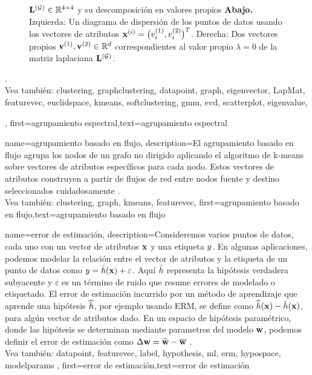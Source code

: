{{\begin{figure}[H]
\begin{center}
{					${\bf L}^{(\mathcal{G})}  \in \mathbb{R}^{4 \times 4}$ y su descomposición en valores propios 
					{\bf Abajo.} Izquierda: Un diagrama de dispersión de los puntos de datos usando los vectores de atributos
					${\bf x}^{(i)} = \big( v^{(1)}_{i},v^{(2)}_{i} \big)^{T}$. 
					Derecha: Dos vectores propios ${\bf v}^{(1)},{\bf v}^{(2)} \in \mathbb{R}^{d}$ 
					correspondientes al valor propio $\lambda=0$ de la matriz laplaciana ${\bf L}^{(\mathcal{G})}$. 
					} 
			\end{center}
		\end{figure}
	\newpage. \\
	Vea también: \gls{clustering}, \gls{graphclustering}, \gls{datapoint}, \gls{graph}, \gls{eigenvector}, \gls{LapMat}, \gls{featurevec}, \gls{euclidspace}, \gls{kmeans}, \gls{softclustering}, \gls{gmm}, \gls{evd}, \gls{scatterplot}, \gls{eigenvalue},  }, 
	first={agrupamiento espectral},text={agrupamiento espectral} 
}
{name={agrupamiento basado en flujo},
	description={El agrupamiento basado en flujo agrupa los nodos de un 
		grafo no dirigido aplicando el algoritmo de k-means sobre
		vectores de atributos específicos para cada nodo. Estos vectores de atributos construyen a partir de flujos de red entre nodos 
		fuente y destino seleccionados cuidadosamente \cite{FlowSpecClustering2021}.
		\\
	Vea también: \gls{clustering}, \gls{graph}, \gls{kmeans}, \gls{featurevec}}, 
	first={agrupamiento basado en flujo},text={agrupamiento basado en flujo} 
}



{name={error de estimación},
	description={Consideremos varios puntos de datos, cada uno con un vector de atributos ${\bf x}$ y una etiqueta
		$y$. En algunas aplicaciones, podemos modelar la relación entre el vector de atributos y la etiqueta
		de un punto de datos como $y = \bar{h}({\bf x}) + \varepsilon$. Aquí $\bar{h}$ 
		representa la hipótesis verdadera subyacente y $\varepsilon$ es un término de ruido que resume errores de modelado o etiquetado.
		El error de estimación incurrido por un método de aprendizaje que aprende una hipótesis $\widehat{h}$, por ejemplo usando ERM, se define como 
		$\widehat{h}({\bf x}) - \bar{h}({\bf x})$, para algún vector de atributos dado. 
		En un espacio de hipótesis paramétrico, donde las hipótesis se determinan mediante
		parametros del modelo ${\bf w}$, podemos definir el error de estimación como  $\Delta {\bf w} = \widehat{{\bf w}} - \overline{{\bf w}}$ \cite{kay,hastie01statisticallearning}.
		\\
	Vea también: \gls{datapoint}, \gls{featurevec}, \gls{label}, \gls{hypothesis}, \gls{ml}, \gls{erm}, \gls{hypospace}, \gls{modelparams}  },
	first={error de estimación},text={error de estimación} 
}


